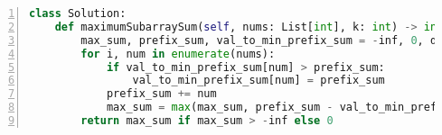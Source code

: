 \begin{figure*}
\centering
\begin{lstlisting}[breaklines=true, language=Python, frame=shadowbox, numbers=left,]
class Solution:
    def maximumSubarraySum(self, nums: List[int], k: int) -> int:
        max_sum, prefix_sum, val_to_min_prefix_sum = -inf, 0, defaultdict(lambda: inf)
        for i, num in enumerate(nums):
            if val_to_min_prefix_sum[num] > prefix_sum:
                val_to_min_prefix_sum[num] = prefix_sum
            prefix_sum += num
            max_sum = max(max_sum, prefix_sum - val_to_min_prefix_sum[num + k], prefix_sum - val_to_min_prefix_sum[num - k])
        return max_sum if max_sum > -inf else 0 
\end{lstlisting}
\label{lst:python-acc}
\end{figure*}
